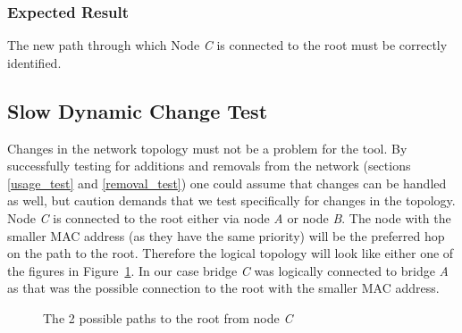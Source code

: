 \subsubsection{Expected Result}
The new path through which Node \textit{C} is connected to the root must be correctly identified.

\subsection{Slow Dynamic Change Test}
\label{slow_dynamic_test}
Changes in the network topology must not be a problem for the tool.
By successfully testing for additions and removals from the network (sections \ref{usage_test} and \ref{removal_test}) one could assume that changes can be handled as well, but caution demands that we test specifically for changes in the topology.
Node \textit{C} is connected to the root either via node \textit{A} or node \textit{B}.
The node with the smaller MAC address (as they have the same priority) will be the preferred hop on the path to the root.
Therefore the logical topology will look like either one of the figures in Figure~\ref{fig:possible_topologies}.
In our case bridge \textit{C} was logically connected to bridge \textit{A} as that was the possible connection to the root with the smaller MAC address.

\begin{figure}[hp]
    \centering
    \hspace{1cm}
    \caption{The 2 possible paths to the root from node \textit{C}}
    \label{fig:possible_topologies}
\end{figure}

